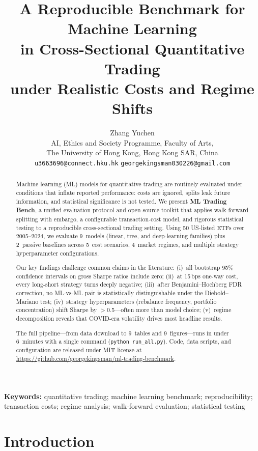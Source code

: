 \documentclass[11pt]{article}
\title{A Reproducible Benchmark for Machine Learning \\
in Cross-Sectional Quantitative Trading \\
under Realistic Costs and Regime Shifts}
\author{Zhang Yuchen \\
  AI, Ethics and Society Programme, Faculty of Arts, \\
  The University of Hong Kong, Hong Kong SAR, China \\
  \texttt{u3663696@connect.hku.hk} \quad \texttt{georgekingsman030226@gmail.com}}
\date{}
\begin{document}
\maketitle

\begin{abstract}
Machine learning (ML) models for quantitative trading are routinely evaluated under conditions that inflate reported performance: costs are ignored, splits leak future information, and statistical significance is not tested.
We present \textbf{ML Trading Bench}, a unified evaluation protocol and open-source toolkit that applies walk-forward splitting with embargo, a configurable transaction-cost model, and rigorous statistical testing to a reproducible cross-sectional trading setting.
Using 50 US-listed ETFs over 2005--2024, we evaluate 9~models (linear, tree, and deep-learning families) plus 2~passive baselines across 5~cost scenarios, 4~market regimes, and multiple strategy hyperparameter configurations.

Our key findings challenge common claims in the literature:
(i)~all bootstrap 95\% confidence intervals on gross Sharpe ratios include zero;
(ii)~at 15\,bps one-way cost, every long-short strategy turns deeply negative;
(iii)~after Benjamini--Hochberg FDR correction, no ML-vs-ML pair is statistically distinguishable under the Diebold--Mariano test;
(iv)~strategy hyperparameters (rebalance frequency, portfolio concentration) shift Sharpe by $>$0.5---often more than model choice;
(v)~regime decomposition reveals that COVID-era volatility drives most headline results.

The full pipeline---from data download to 9~tables and 9~figures---runs in under 6~minutes with a single command (\texttt{python run\_all.py}).
Code, data scripts, and configuration are released under MIT license at
\url{https://github.com/georgekingsman/ml-trading-benchmark}.
\end{abstract}

\noindent\textbf{Keywords:}
quantitative trading;
machine learning benchmark;
reproducibility;
transaction costs;
regime analysis;
walk-forward evaluation;
statistical testing

\tableofcontents
\newpage

\section{Introduction}
\label{sec:intro}
\end{document}
